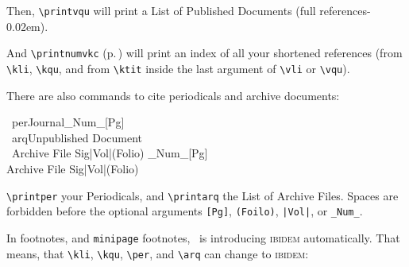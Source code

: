 \documentclass[12pt,a4paper]{article}
\newcommand{\pbs}{\string\ \unskip}
\newcommand{\bs}{\protect\pbs}
\renewcommand{\{}{{\normalfont\lbashortmem}}
\renewcommand{\}}{{\normalfont\rbashortmem}}
\begin{document}
 \vspace{-.25ex}\noindent 
 Then, \verb|\printvqu| will print a List of Published Documents 
 (full references\kern -0.02em). 

 \vspace{.75ex}\noindent 
 And \verb|\printnumvkc| (p.\,\pageref{vkc}) will print an index 
 of all your shortened references (from \verb|\kli|, \verb|\kqu|, and 
 from \verb|\ktit| inside the last argument of \verb|\vli| or \verb|\vqu|).
 
 \vspace{.75ex}\vfill\noindent
 There are also \BibArts\hy commands to cite periodicals 
 and archive documents:
 
 \vspace{-.35ex}
 \Doppelbox
 {
  \bs per\{Journal\}\string_Num\string_[Pg]
  \\[1ex]
  \bs arq\{Unpublished Document\}
  \\ \ \{Archive File Sig\}\string|Vol\string|(Folio)
 }
 {
  _Num_[Pg]
  \\[.5ex]        
   {Archive File Sig}|Vol|(Folio)
 }

 \vspace{-.25ex}\noindent 
 \verb|\printper| your Periodicals, and \verb|\printarq| the List of Archive
 Files. Spaces are forbidden before the optional arguments \verb+[Pg]+,
 \verb+(Foilo)+, \verb+|Vol|+, or \verb+_Num_+.


\newpage
\noindent
In footnotes, and \texttt{minipage} footnotes, \BibArts\ is introducing 
\textsc{ibidem} automatically. That means, that \verb|\kli|, \verb|\kqu|, 
\verb|\per|, and \verb|\arq| can change to \textsc{ibidem}:
\end{document}

